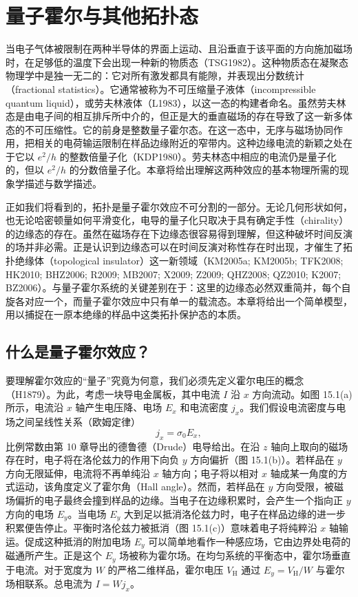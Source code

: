 \chapter{量子霍尔与其他拓扑态}

当电子气体被限制在两种半导体的界面上运动、且沿垂直于该平面的方向施加磁场时，在足够低的温度下会出现一种新的物质态（TSG1982）。这种物质态在凝聚态物理学中是独一无二的：它对所有激发都具有能隙，并表现出分数统计（fractional statistics）。它通常被称为不可压缩量子液体（incompressible quantum liquid），或劳夫林液体（L1983），以这一态的构建者命名。虽然劳夫林态是由电子间的相互排斥所中介的，但正是大的垂直磁场的存在导致了这一新多体态的不可压缩性。它的前身是整数量子霍尔态。在这一态中，无序与磁场协同作用，把相关的电荷输运限制在样品边缘附近的窄带内。这种边缘电流的新颖之处在于它以 $e^{2}/h$ 的整数倍量子化（KDP1980）。劳夫林态中相应的电流仍是量子化的，但以 $e^{2}/h$ 的分数倍量子化。本章将给出理解这两种效应的基本物理所需的现象学描述与数学描述。

正如我们将看到的，拓扑是量子霍尔效应不可分割的一部分。无论几何形状如何，也无论哈密顿量如何平滑变化，电导的量子化只取决于具有确定手性（chirality）的边缘态的存在。虽然在磁场存在下边缘态很容易得到理解，但这种破坏时间反演的场并非必需。正是认识到边缘态可以在时间反演对称性存在时出现，才催生了拓扑绝缘体（topological insulator）这一新领域（KM2005a; KM2005b; TFK2008; HK2010; BHZ2006; R2009; MB2007; X2009; Z2009; QHZ2008; QZ2010; K2007; BZ2006）。与量子霍尔系统的关键差别在于：这里的边缘态必然双重简并，每个自旋各对应一个，而量子霍尔效应中只有单一的载流态。本章将给出一个简单模型，用以捕捉在一原本绝缘的样品中这类拓扑保护态的本质。

\section{什么是量子霍尔效应？}

要理解霍尔效应的“量子”究竟为何意，我们必须先定义霍尔电压的概念（H1879）。为此，考虑一块导电金属板，其中电流 $I$ 沿 $x$ 方向流动。如图 15.1(a) 所示，电流沿 $x$ 轴产生电压降、电场 $E_{x}$ 和电流密度 $j_{x}$。我们假设电流密度与电场之间呈线性关系（欧姆定律）
\begin{equation*}
j_{x}=\sigma_{0}E_{x},
\end{equation*}
比例常数由第 10 章导出的德鲁德（Drude）电导给出。在沿 $z$ 轴向上取向的磁场存在时，电子将在洛伦兹力的作用下向负 $y$ 方向偏折（图 15.1(b)）。若样品在 $y$ 方向无限延伸，电流将不再单纯沿 $x$ 轴方向；电子将以相对 $x$ 轴成某一角度的方式运动，该角度定义了霍尔角（Hall angle）。然而，若样品在 $y$ 方向受限，被磁场偏折的电子最终会撞到样品的边缘。当电子在边缘积累时，会产生一个指向正 $y$ 方向的电场 $E_{y}$。当电场 $E_{y}$ 大到足以抵消洛伦兹力时，电子在样品边缘的进一步积累便告停止。平衡时洛伦兹力被抵消（图 15.1(c)）意味着电子将纯粹沿 $x$ 轴输运。促成这种抵消的附加电场 $E_{y}$ 可以简单地看作一种感应场，它由边界处电荷的磁通所产生。正是这个 $E_{y}$ 场被称为霍尔场。在均匀系统的平衡态中，霍尔场垂直于电流。对于宽度为 $W$ 的严格二维样品，霍尔电压 $V_{\mathrm{H}}$ 通过 $E_{y}=V_{\mathrm{H}}/W$ 与霍尔场相联系。总电流为 $I=Wj_{x}$。

